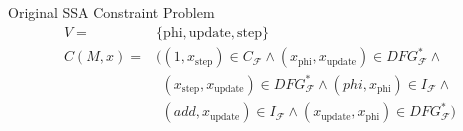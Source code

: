 \centering
\begin{blackwhitebox}{Original SSA Constraint Problem}
    \setlength{\abovedisplayskip}{0pt}
    \setlength{\belowdisplayskip}{0pt}
    \vspace{-0.5em}
    \begin{align*}
        V={}&\{\text{phi}, \text{update}, \text{step}\}\\
        C(M,x)={}&    ((1,x_\text{step})
                        \in C_\mathcal{F}\mathrel\land
                       (x_\text{phi},x_\text{update})
                        \in DFG_\mathcal{F}^*\mathrel\land\\
           &\phantom{(}(x_\text{step},x_\text{update})
                        \in DFG_\mathcal{F}^* \mathrel\land
                       (phi,x_\text{phi})
                        \in I_\mathcal{F}\mathrel\land\\
           &\phantom{(}(add,x_\text{update})
                        \in I_\mathcal{F}\mathrel\land
                       (x_\text{update},x_\text{phi})
                        \in DFG_\mathcal{F}^*)
    \end{align*}
\end{blackwhitebox}

